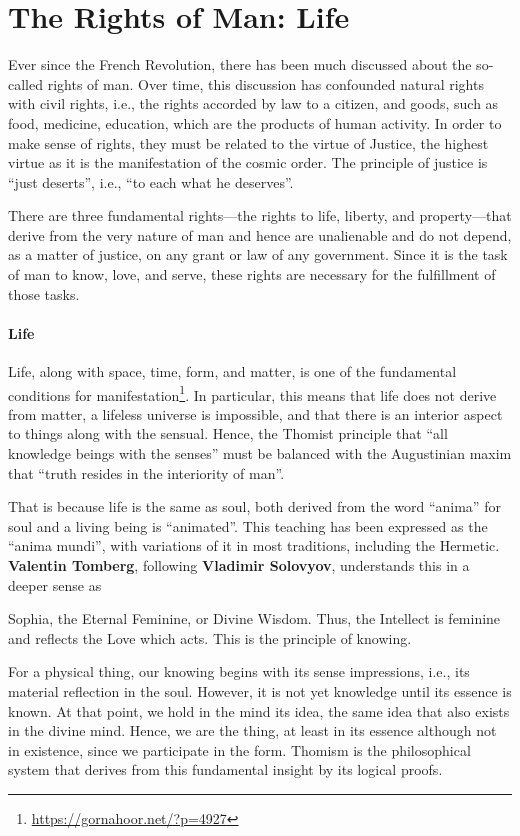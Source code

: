 \section{The Rights of Man: Life}

Ever since the French Revolution, there has been much discussed about the so-called rights of man. Over time, this discussion has confounded natural rights with civil rights, i.e., the rights accorded by law to a citizen, and goods, such as food, medicine, education, which are the products of human activity. In order to make sense of rights, they must be related to the virtue of Justice, the highest virtue as it is the manifestation of the cosmic order. The principle of justice is ``just deserts'', i.e., ``to each what he deserves''.

There are three fundamental rights---the rights to life, liberty, and property---that derive from the very nature of man and hence are unalienable and do not depend, as a matter of justice, on any grant or law of any government. Since it is the task of man to know, love, and serve, these rights are necessary for the fulfillment of those tasks.

\paragraph{Life}


Life, along with space, time, form, and matter, is one of the fundamental conditions for manifestation\footnote{\url{https://gornahoor.net/?p=4927}}. In particular, this means that life does not derive from matter, a lifeless universe is impossible, and that there is an interior aspect to things along with the sensual. Hence, the Thomist principle that ``all knowledge beings with the senses'' must be balanced with the Augustinian maxim that ``truth resides in the interiority of man''.

That is because life is the same as soul, both derived from the word ``anima'' for soul and a living being is ``animated''. This teaching has been expressed as the ``anima mundi'', with variations of it in most traditions, including the Hermetic. \textbf{Valentin Tomberg}, following
\textbf{Vladimir Solovyov}, understands this in a deeper sense as

Sophia, the Eternal Feminine, or Divine Wisdom. Thus, the Intellect is feminine and reflects the Love which acts. This is the principle of knowing.

For a physical thing, our knowing begins with its sense impressions, i.e., its material reflection in the soul. However, it is not yet knowledge until its essence is known. At that point, we hold in the mind its idea, the same idea that also exists in the divine mind. Hence, we are the thing, at least in its essence although not in existence, since we participate in the form. Thomism is the philosophical system that derives from this fundamental insight by its logical proofs.

